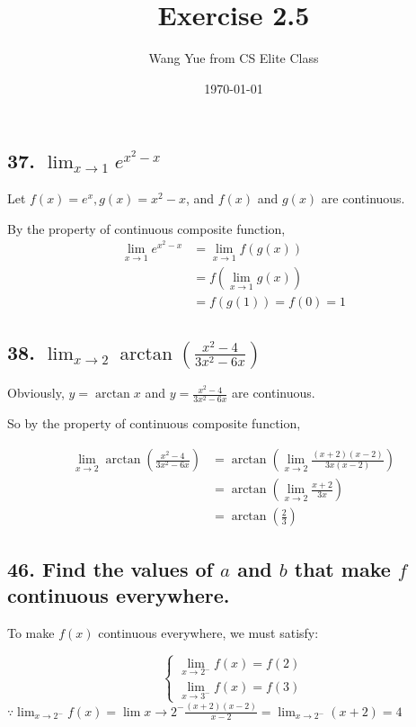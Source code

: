 \documentclass{article}
\begin{document}
    \title{Exercise 2.5}
    \author{Wang Yue from CS Elite Class}
    \date{\today}

    \maketitle

    \subsection*{37. $\lim_{x \to 1}e^{x^2-x}$}

    Let $f(x) = e^x, g(x) = x^2 - x$, and $f(x)$ and $g(x)$ are continuous.

    By the property of continuous composite function,
    $$
    \begin{aligned}
        \lim_{x \to 1}e^{x^2 - x} &= \lim_{x \to 1}f(g(x)) \\
        &= f(\lim_{x \to 1}g(x)) \\
        &= f(g(1)) = f(0) = 1
    \end{aligned}
    $$

    \subsection*{38. $\lim_{x \to 2} \arctan(\frac{x^2 - 4}{3x^2 - 6x})$}

    Obviously, $y = \arctan x$ and $y = \frac{x^2 - 4}{3x^2 - 6x}$ are continuous.

    So by the property of continuous composite function,

    $$
    \begin{aligned}
        \lim_{x \to 2} \arctan(\frac{x^2 - 4}{3x^2 - 6x}) &= \arctan(\lim_{x \to 2}\frac{(x + 2)(x - 2)}{3x(x - 2)}) \\
        &= \arctan(\lim_{x \to 2}\frac{x + 2}{3x}) \\
        &= \arctan(\frac{2}{3})
    \end{aligned}
    $$

    \subsection*{46. Find the values of $a$ and $b$ that make $f$ continuous everywhere. }

    To make $f(x)$ continuous everywhere, we must satisfy:

    \begin{equation*}
        \left\{
        \begin{aligned}
            \lim_{x \to 2^-}f(x) = f(2) \\
            \lim_{x \to 3^-}f(x) = f(3)
        \end{aligned}
        \right .
    \end{equation*}
    $\because \lim_{x \to 2^-}f(x) = \lim{x \to 2^-}\frac{(x + 2)(x - 2)}{x - 2} = \lim_{x \to 2^-}(x + 2) = 4$
\end{document}
